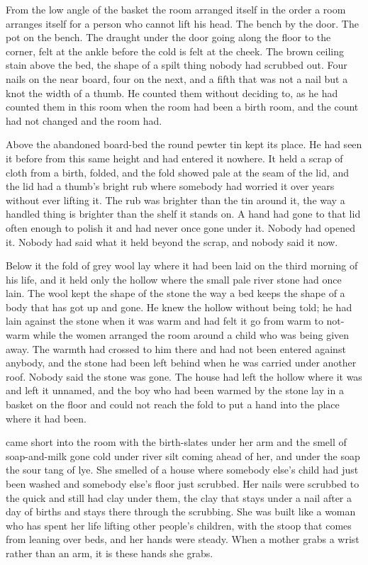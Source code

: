 From the low angle of the basket the room arranged itself in the order a room arranges itself for a person who cannot lift his head. The bench by the door. The pot on the bench. The draught under the door going along the floor to the corner, felt at the ankle before the cold is felt at the cheek. The brown ceiling stain above the bed, the shape of a spilt thing nobody had scrubbed out. Four nails on the near board, four on the next, and a fifth that was not a nail but a knot the width of a thumb. He counted them without deciding to, as he had counted them in this room when the room had been a birth room, and the count had not changed and the room had.

Above the abandoned board-bed the round pewter tin kept its place. He had seen it before from this same height and had entered it nowhere. It held a scrap of cloth from a birth, folded, and the fold showed pale at the seam of the lid, and the lid had a thumb's bright rub where somebody had worried it over years without ever lifting it. The rub was brighter than the tin around it, the way a handled thing is brighter than the shelf it stands on. A hand had gone to that lid often enough to polish it and had never once gone under it. Nobody had opened it. Nobody had said what it held beyond the scrap, and nobody said it now.

Below it the fold of grey wool lay where it had been laid on the third morning of his life, and it held only the hollow where the small pale river stone had once lain. The wool kept the shape of the stone the way a bed keeps the shape of a body that has got up and gone. He knew the hollow without being told; he had lain against the stone when it was warm and had felt it go from warm to not-warm while the women arranged the room around a child who was being given away. The warmth had crossed to him there and had not been entered against anybody, and the stone had been left behind when he was carried under another roof. Nobody said the stone was gone. The house had left the hollow where it was and left it unnamed, and the boy who had been warmed by the stone lay in a basket on the floor and could not reach the fold to put a hand into the place where it had been.

\scenebreak

 came short into the room with the birth-slates under her arm and the smell of soap-and-milk gone cold under river silt coming ahead of her, and under the soap the sour tang of lye. She smelled of a house where somebody else's child had just been washed and somebody else's floor just scrubbed. Her nails were scrubbed to the quick and still had clay under them, the clay that stays under a nail after a day of births and stays there through the scrubbing. She was built like a woman who has spent her life lifting other people's children, with the stoop that comes from leaning over beds, and her hands were steady. When a mother grabs a wrist rather than an arm, it is these hands she grabs.

